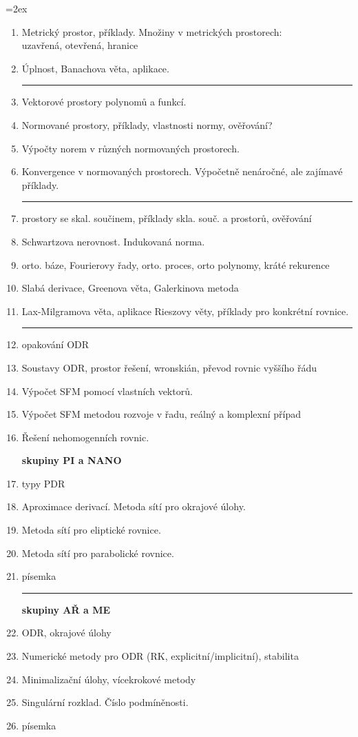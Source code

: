 \documentclass[a4,11pt]{article}
\begin{document}
\parskip=2ex
\parindent=0pt
\pagestyle{empty}
\begin{enumerate}
 \item Metrický prostor, příklady. Množiny v metrických prostorech:\\ 
       uzavřená, otevřená, hranice
 \item Úplnost, Banachova věta, aplikace.

\hrule
 \item Vektorové prostory polynomů a funkcí.
 \item Normované prostory, příklady, vlastnosti normy, ověřování? 
 \item Výpočty norem v různých normovaných prostorech.
 \item Konvergence v normovaných prostorech. Výpočetně nenáročné, ale zajímavé příklady.
 
\hrule

 \item prostory se skal. součinem, příklady skla. souč. a prostorů, ověřování
 \item Schwartzova nerovnost. Indukovaná norma.
 \item orto. báze, Fourierovy řady, orto. proces, orto polynomy, kráté rekurence
 \item Slabá derivace, Greenova věta, Galerkinova metoda
 \item Lax-Milgramova věta, aplikace Rieszovy věty, příklady pro konkrétní rovnice.

\hrule
 \item opakování ODR 
 \item Soustavy ODR, prostor řešení, wronskián, převod rovnic vyššího řádu
 \item Výpočet SFM pomocí vlastních vektorů.
 \item Výpočet SFM metodou rozvoje v řadu, reálný a komplexní případ
 \item Řešení nehomogenních rovnic.

{\bf skupiny PI a NANO}

 \item typy PDR
 \item Aproximace derivací. Metoda sítí  pro okrajové úlohy.
 \item Metoda sítí pro eliptické rovnice.
 \item Metoda sítí pro parabolické rovnice.
 \item písemka

\hrule
{\bf skupiny AŘ a ME}
 \item ODR, okrajové úlohy
 \item Numerické metody pro ODR (RK, explicitní/implicitní), stabilita
 \item Minimalizační úlohy, vícekrokové metody
 \item Singulární rozklad. Číslo podmíněnosti.
 \item písemka
\end{enumerate}
\end{document}
